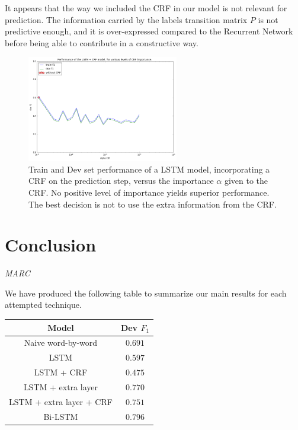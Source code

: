 \documentclass{article} %
\begin{document}
It appears that the way we included the CRF in our model is not relevant for prediction. The information carried by the labels transition matrix $P$ is not predictive enough, and it is over-expressed compared to the Recurrent Network before being able to contribute in a constructive way.

\begin{figure}
\begin{center}
\includegraphics[width=250px]{figs/LSTM-CRF-vs-alpha.png}
\caption{Train and Dev set performance of a LSTM model, incorporating a CRF on the prediction step, versus the importance $\alpha$ given to the CRF. No positive level of importance yields superior performance. The best decision is not to use the extra information from the CRF. }
\label{lstm-crf-results}
\end{center}
\end{figure}

\section{Conclusion}
\textit{MARC}

We have produced the following table to summarize our main results for each attempted technique.

\begin{center}
 \begin{tabular}{||c | c||}
 \hline
 Model  & Dev $F_1$ \\
 \hline\hline
 Naive word-by-word & $0.691$ \\
 \hline
 LSTM & $0.597$ \\
 \hline
 LSTM + CRF & $0.475$ \\
 \hline
 LSTM + extra layer & $0.770$ \\
 \hline
 LSTM + extra layer + CRF & $0.751$ \\
 \hline
 Bi-LSTM & $0.796$ \\ [1ex]
 \hline
\end{tabular}
\end{center}
\end{document}
